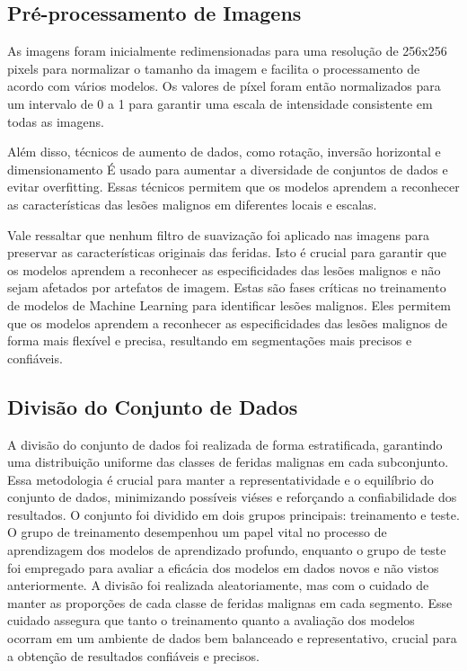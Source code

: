 \subsection{Pré-processamento de Imagens}

    As imagens foram inicialmente redimensionadas para uma resolução de 256x256 pixels para normalizar o tamanho da imagem e facilita o processamento de acordo com vários modelos. Os valores de píxel foram então normalizados para um intervalo de 0 a 1 para garantir uma escala de intensidade consistente em todas as imagens.

    Além disso, técnicos de aumento de dados, como rotação, inversão horizontal e dimensionamento É usado para aumentar a diversidade de conjuntos de dados e evitar overfitting. Essas técnicos permitem que os modelos aprendem a reconhecer as características das lesões malignos em diferentes locais e escalas.

    Vale ressaltar que nenhum filtro de suavização foi aplicado nas imagens para preservar as características originais das feridas. Isto é crucial para garantir que os modelos aprendem a reconhecer as especificidades das lesões malignos e não sejam afetados por artefatos de imagem. Estas são fases críticas no treinamento de modelos de Machine Learning para identificar lesões malignos. Eles permitem que os modelos aprendem a reconhecer as especificidades das lesões malignos de forma mais flexível e precisa, resultando em segmentações mais precisos e confiáveis.

\subsection{Divisão do Conjunto de Dados}
    A divisão do conjunto de dados foi realizada de forma estratificada, garantindo uma distribuição uniforme das classes de feridas malignas em cada subconjunto. Essa metodologia é crucial para manter a representatividade e o equilíbrio do conjunto de dados, minimizando possíveis viéses e reforçando a confiabilidade dos resultados. O conjunto foi dividido em dois grupos principais: treinamento e teste. O grupo de treinamento desempenhou um papel vital no processo de aprendizagem dos modelos de aprendizado profundo, enquanto o grupo de teste foi empregado para avaliar a eficácia dos modelos em dados novos e não vistos anteriormente. A divisão foi realizada aleatoriamente, mas com o cuidado de manter as proporções de cada classe de feridas malignas em cada segmento. Esse cuidado assegura que tanto o treinamento quanto a avaliação dos modelos ocorram em um ambiente de dados bem balanceado e representativo, crucial para a obtenção de resultados confiáveis e precisos.

